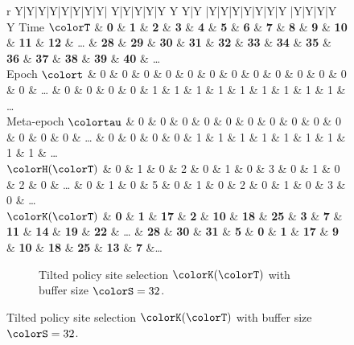 \begin{figure}[htbp!]
  \centering

\begin{minipage}{\textwidth}
  \scriptsize
  \setlength{\tabcolsep}{2.5pt}
  \begin{tabularx}{\textwidth}{
    r
    Y|Y|Y|Y|Y|Y|Y|Y|
    Y|Y|Y|Y|Y Y Y|Y
    |Y|Y|Y|Y|Y|Y|Y
    |Y|Y|Y|Y Y
    }
     { Time $\colorT$} & \textbf{0} & \textbf{1} & \textbf{2} & \textbf{3} & \textbf{4} & \textbf{5} & \textbf{6} & \textbf{7}
    & \textbf{8} & \textbf{9} & \textbf{10} & \textbf{11} & \textbf{12} %
    &  \ldots
    & \textbf{28} & \textbf{29} & \textbf{30} & \textbf{31}
    & \textbf{32} & \textbf{33} & \textbf{34} & \textbf{35}
    & \textbf{36} & \textbf{37} & \textbf{38} & \textbf{39} & \textbf{40}
    & \ldots \\ \hline
   { Epoch $\colort$} & 0 & 0 & 0 & 0 & 0 & 0 & 0 & 0
    & 0 & 0 & 0 & 0 & 0 %
    &  \ldots
    & 0 & 0 & 0 & 0
    & 1 & 1 & 1 & 1
    & 1 & 1 & 1 & 1 & 1
    & \ldots \\
   { Meta-epoch $\colortau$} & 0 & 0 & 0 & 0 & 0 & 0 & 0 & 0
    & 0 & 0 & 0 & 0 & 0 %
    &  \ldots
    & 0 & 0 & 0 & 0
    & 1 & 1 & 1 & 1
    & 1 & 1 & 1 & 1 & 1
    & \ldots \\
    { \scriptsize$\colorH(\colorT)$} & 0 & 1 & 0 & 2 & 0 & 1 & 0 & 3
    & 0 & 1 & 0 & 2 & 0 %
    &  \ldots
    & 0 & 1 & 0 & 5
    & 0 & 1 & 0 & 2
    & 0 & 1 & 0 & 3 & 0
    & \ldots \\ \hline
     { \scriptsize $\colorK(\colorT)$} & \textbf{0} & \textbf{1} & \textbf{17} & \textbf{2} & \textbf{10} & \textbf{18} & \textbf{25} & \textbf{3}
     & \textbf{7} & \textbf{11} & \textbf{14} & \textbf{19} & \textbf{22} & \ldots
 & \textbf{28} & \textbf{30} & \textbf{31} & \textbf{5} & \textbf{0}
 & \textbf{1} & \textbf{17} & \textbf{9} & \textbf{10}
 & \textbf{18} & \textbf{25} & \textbf{13} & \textbf{7}  &\ldots
  \end{tabularx}
\end{minipage}
\begin{subfigure}{\textwidth}
\vspace{-1ex}
\caption{\footnotesize Tilted policy site selection $\colorK(\colorT)$ with buffer size $\colorS=32$.}
\label{fig:hsurf-tilted-implementation-site-selection}
\end{subfigure}


\end{figure}
